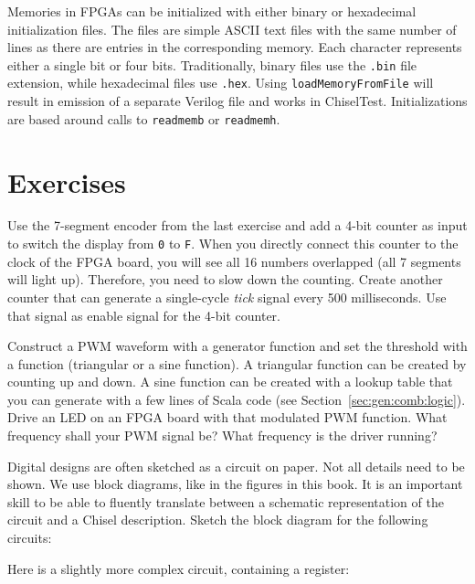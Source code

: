 \documentclass[%
    10pt,
    headinclude, footexclude,
    openright, %
    notitlepage,
    cleardoubleempty,
    headsepline,
    pointlessnumbers,
    bibtotoc, idxtotoc,
    ]{scrbook}
\newcommand{\code}[1]{{\lstinline[basicstyle=\small\ttfamily]{#1}}}
\begin{document}
Memories in FPGAs can be initialized with either binary or hexadecimal initialization files.
The files are simple ASCII text files with the same number of lines as there are
entries in the corresponding memory. Each character represents either a single bit
or four bits. Traditionally, binary files use the \code{.bin} file extension, while
hexadecimal files use \code{.hex}. Using \code{loadMemoryFromFile} will result in
emission of a separate Verilog file and works in ChiselTest.
Initializations are based around calls to \code{readmemb} or \code{readmemh}.

\section{Exercises}

Use the 7-segment encoder from the last exercise and add a 4-bit counter as input
to switch the display from \code{0} to \code{F}. When you directly connect this
counter to the clock of the FPGA board, you will see all 16 numbers
overlapped (all 7 segments will light up).
Therefore, you need to slow down the counting. Create another
counter that can generate a single-cycle \emph{tick} signal every 500 milliseconds.
Use that signal as enable signal for the 4-bit counter.

Construct a PWM waveform with a generator function and set the threshold with a
function (triangular or a sine function).
A triangular function can be created by counting up and down. A sine function can be created with
a lookup table that you can generate with a few lines of Scala code
(see Section~\ref{sec:gen:comb:logic}).
Drive an LED on an FPGA board with that modulated PWM function. What frequency shall your
PWM signal be? What frequency is the driver running?

Digital designs are often sketched as a circuit on paper. Not all details need to be shown.
We use block diagrams, like in the figures in this book. It is an important skill to be able
to fluently translate between a schematic representation of the circuit and a Chisel description.
Sketch the block diagram for the following circuits:


\noindent Here is a slightly more complex circuit, containing a register:

\end{document}
